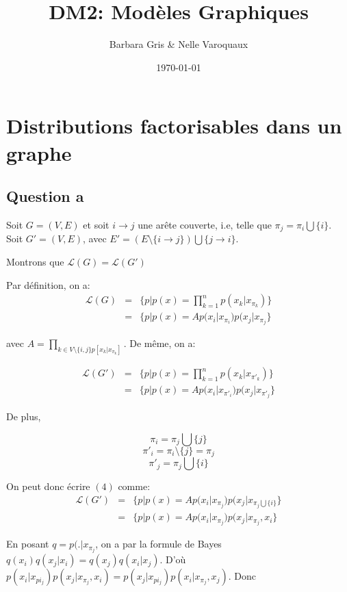 \documentclass{article}
\date{\today}
\title{DM2: Modèles Graphiques}
\author{Barbara Gris \& Nelle Varoquaux}
\begin{document}
\maketitle
\tableofcontents{}
\vfill \eject

\section{Distributions factorisables dans un graphe}
\subsection{Question a}

Soit $G = (V, E)$ et soit $i \rightarrow j$ une arête couverte, i.e, telle que
$\pi_j = \pi_i \bigcup \{i\}$.
Soit $G'= (V,E)$, avec $E' = (E \setminus \{i \rightarrow j\}) \bigcup \{j \rightarrow i\}$.

Montrons que $\mathcal{L}(G) = \mathcal{L}(G')$


Par définition, on a:
\begin{align}
\mathcal{L}(G) & = & \{ p | p(x) = \prod_{k = 1}^{n} p(x_k | x_{\pi_k}) \} \\
	       & = & \{ p | p(x) = A p(x_i | x_{\pi_i}) p(x_j | x_{\pi_j} \}
\end{align}

avec $A = \prod_{k \in V \setminus \{i, j\} p[x_k | x_{\pi_k}]}$. De même, on a:

\begin{align}
\mathcal{L}(G') & = & \{ p | p(x) = \prod_{k = 1}^{n} p(x_k | x_{\pi'_k}) \} \\
		& = & \{ p | p(x) = A p(x_i | x_{\pi'_i}) p(x_j | x_{\pi'_j} \}
\end{align}

De plus,

$$\pi_i = \pi_j \bigcup \{ j \}$$
$$\pi'_i = \pi_i \setminus \{ j \} = \pi_j$$
$$\pi'_j = \pi_j \bigcup \{ i \}$$

On peut donc écrire $(4)$ comme:
\begin{align}
\mathcal{L}(G') & = & \{ p | p(x) = A p(x_i | x_{\pi_j}) p(x_j | x_{\pi_j \bigcup \{ i \}}  \} \\
		& = & \{ p | p(x) = A p(x_i | x_{\pi_j}) p(x_j | x_{\pi_j}, x_i \}
\end{align}

En posant $q = p(. | x_{\pi_j}$, on a par la formule de Bayes $q(x_i)q(x_j | x_i) =  q(x_j)q(x_i | x_j)$.
D'où $p(x_i | x_{pi_j})p(x_j | x_{\pi_j}, x_i) = p(x_j | x_{pi_j})p(x_i | x_{\pi_j}, x_j)$. Donc
\end{document}
